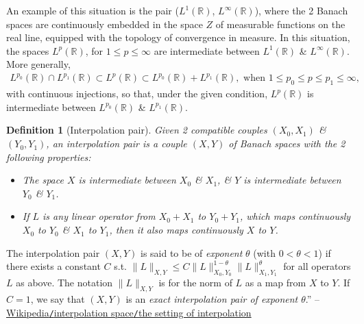 \documentclass[oneside]{book}
\numberwithin{equation}{section}
\newtheorem{definition}{Definition}[chapter]
\begin{document}
An example of this situation is the pair ($L^1(\mathbb{R})$, $L^\infty(\mathbb{R})$), where the 2 Banach spaces are continuously embedded in the space $Z$ of measurable functions on the real line, equipped with the topology of convergence in measure. In this situation, the spaces $L^p(\mathbb{R})$, for $1\le p\le\infty$ are intermediate between $L^1(\mathbb{R})$ \& $L^\infty(\mathbb{R})$. More generally,
\begin{align*}
	L^{p_0}(\mathbb{R})\cap L^{p_1}(\mathbb{R})\subset L^p(\mathbb{R})\subset L^{p_0}(\mathbb{R}) + L^{p_1}(\mathbb{R}),\mbox{ when } 1\le p_0\le p\le p_1\le\infty,
\end{align*}
with continuous injections, so that, under the given condition, $L^p(\mathbb{R})$ is intermediate between $L^{p_0}(\mathbb{R})$ \& $L^{p_1}(\mathbb{R})$.

\begin{definition}[Interpolation pair]
	Given 2 compatible couples $(X_0,X_1)$ \& $(Y_0,Y_1)$, an \emph{interpolation pair} is a couple $(X,Y)$ of Banach spaces with the 2 following properties:
	\begin{itemize}
		\item The space $X$ is intermediate between $X_0$ \& $X_1$, \& $Y$ is intermediate between $Y_0$ \& $Y_1$.
		\item If $L$ is any linear operator from $X_0 + X_1$ to $Y_0 + Y_1$, which maps continuously $X_0$ to $Y_0$ \& $X_1$ to $Y_1$, then it also maps continuously $X$ to $Y$.
	\end{itemize}
\end{definition}
The interpolation pair $(X,Y)$ is said to be of \textit{exponent} $\theta$ (with $0 < \theta < 1$) if there exists a constant $C$ s.t. $\|L\|_{X,Y}\le C\|L\|_{X_0,Y_0}^{1-\theta}\|L\|_{X_1,Y_1}^\theta$ for all operators $L$ as above. The notation $\|L\|_{X,Y}$  is for the norm of $L$ as a map from $X$ to $Y$. If $C = 1$, we say that $(X,Y)$ is an \textit{exact interpolation pair of exponent $\theta$}.'' -- \href{https://en.wikipedia.org/wiki/Interpolation_space#The_setting_of_interpolation}{Wikipedia\texttt{/}interpolation space\texttt{/}the setting of interpolation}
\end{document}
